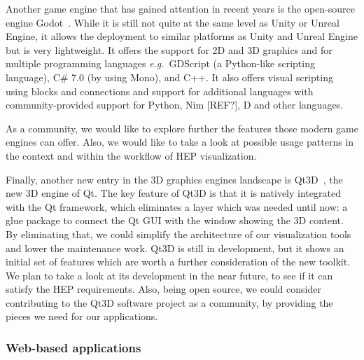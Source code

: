 \documentclass[12pt,a4paper]{article}
\begin{document}


Another game engine that has gained attention in recent years is the open-source engine Godot~\cite{Godot}.
While it is still not quite at the same level as Unity or Unreal Engine, it allows the deployment to similar platforms as Unity and Unreal
Engine but is very lightweight.
It offers the support for 2D and 3D graphics and for multiple programming languages {\it e.g.}\ GDScript (a Python-like scripting language),
 C\# 7.0 (by using Mono), and C++.
It also offers visual scripting using blocks and connections and support for additional languages with
community-provided support for Python, Nim [REF?], D and other languages.

As a community, we would like to explore further the features those modern game engines can offer. Also, we would like to take a
look at possible usage patterns in the context and within the workflow of HEP visualization.

Finally, another new entry in the 3D graphics engines landscape is Qt3D~\cite{Qt3d},  the new 3D engine of Qt. The key feature of
Qt3D is that it is natively integrated with the Qt framework, which eliminates a layer which was needed until now: a glue
package to connect the Qt GUI with the window showing the 3D content. By eliminating that, we could simplify the architecture
of our visualization tools and lower the maintenance work. Qt3D is still in development, but it shows an initial set of
features which are worth a further consideration of the new toolkit. We plan to take a look at its development in the near future,
to see if it can satisfy the HEP requirements. Also, being open source, we could consider contributing to the Qt3D software
project as a community, by providing the pieces we need for our applications.

\hypertarget{web-based}{%
\subsubsection{Web-based applications}\label{web-based}}
\end{document}
